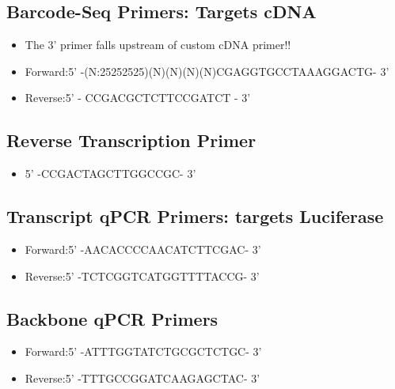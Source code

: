\documentclass[a4paper]{article}
\begin{document}
   \subsection{Barcode-Seq  Primers: Targets cDNA}
        \begin{itemize}
			\item The 3' primer falls upstream of custom cDNA primer!!
			\item Forward:5' -(N:25252525)(N)(N)(N)(N)CGAGGTGCCTAAAGGACTG- 3'
        	\item Reverse:5' - CCGACGCTCTTCCGATCT - 3'
		        
 		\end{itemize}
   
   \subsection{Reverse Transcription Primer}
        \begin{itemize}

			\item 5' -CCGACTAGCTTGGCCGC- 3'
        	    
 		\end{itemize}
	
    \subsection{Transcript qPCR  Primers: targets Luciferase}
        \begin{itemize}

			\item Forward:5' -AACACCCCAACATCTTCGAC- 3'
        	\item Reverse:5' -TCTCGGTCATGGTTTTACCG- 3'
		        
 		\end{itemize}

	\subsection{Backbone qPCR  Primers}
        \begin{itemize}

			\item Forward:5' -ATTTGGTATCTGCGCTCTGC- 3'
        	\item Reverse:5' -TTTGCCGGATCAAGAGCTAC- 3'
		        
 		\end{itemize}
\end{document}
